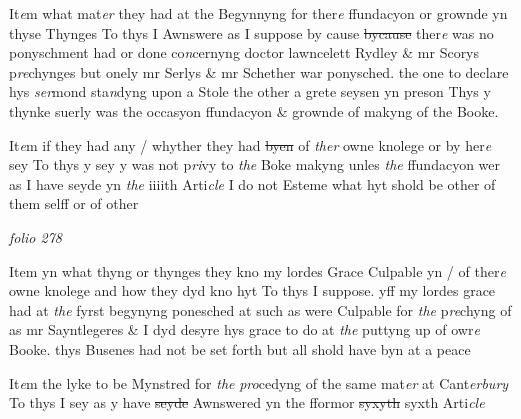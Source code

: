 \documentclass[12pt, a4paper]{book}
\begin{document}
 
		\ifthenelse{\isodd{\thepage}}
		{\reversemarginpar}
		{\normalmarginpar}
		It\textit{e}m what mat\textit{er} they had at the Begynnyng for ther\textit{e} ffundacyon or grownde 
yn thyse Thynges
To thys I Awnswere as I suppose by cause \sout{bycause }ther\textit{e} was no ponyschment
had or done co\textit{n}cernyng doctor lawncelett Rydley 
			\& mr Scorys p\textit{re}chynges but onely mr
Serlys \& mr Schether war ponysched. the one to declare hys \textit{ser}mond sta\textit{n}dyng
upon a Stole the other a grete seysen yn preson Thys y thynke suerly
was the occasyon ffundacyon \& grownde of makyng of the Booke.
            		
				\marginpar[\vspace{0.5cm}{\textcolor{Gray}{5}}]{}
			
 
		\ifthenelse{\isodd{\thepage}}
		{\reversemarginpar}
		{\normalmarginpar}
		It\textit{e}m if
			 they had any / whyther they had \sout{byen }of \textit{ther} owne knolege or by her\textit{e }sey
To thys y sey y was not p\textit{ri}vy to \textit{the} Boke makyng unles \textit{the} ffundacyon wer
as I have seyde yn \textit{the} iiiith Arti\textit{cle} I do not Esteme what hyt shold be other
of them selff or of other

\dotfill
						\newpage
{}

\textit{folio 278}


 	
				\marginpar[\vspace{0.5cm}{\textcolor{Gray}{6}}]{}
			

		\ifthenelse{\isodd{\thepage}}
		{\reversemarginpar}
		{\normalmarginpar}
		 Item yn what thyng or thynges they kno my lordes Grace  Culpable yn / of 
ther\textit{e} owne knolege and how they dyd kno hyt
To thys I suppose. yff my lordes grace  had at \textit{the} fyrst begynyng ponesched
at such as were Culpable for \textit{the} p\textit{re}chyng of as mr Sayntlegeres \& I dyd 
desyre hys grace to do at \textit{the} puttyng up of owr\textit{e} Booke. thys Busenes had
not be set forth but all shold have byn at a peace
 	
				\marginpar[\vspace{0.5cm}{\textcolor{Gray}{7}}]{}
			

		\ifthenelse{\isodd{\thepage}}
		{\reversemarginpar}
		{\normalmarginpar}
		 It\textit{e}m the lyke to be Mynstred for \textit{the}
               \textit{pro}cedyng of the same mat\textit{er} at Cant\textit{erbury}
To thys I sey as y have \sout{seyde }Awnswered yn the fformor \sout{syxyth}
syxth Arti\textit{cle}
 	
\end{document}
